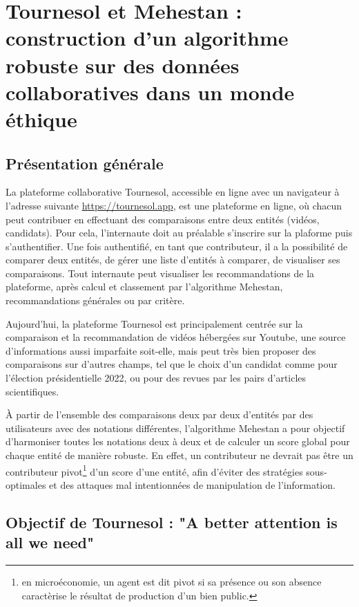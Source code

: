 \section{Tournesol et Mehestan : construction d'un algorithme robuste sur des données collaboratives dans un monde éthique}

\subsection{Présentation générale}

La plateforme collaborative Tournesol, accessible en ligne avec un navigateur à l'adresse suivante \href{https://tournesol.app}{https://tournesol.app}, est une plateforme en ligne, où chacun peut contribuer en effectuant des comparaisons entre deux entités (vidéos, candidats). Pour cela, l'internaute doit au préalable s'inscrire sur la plaforme puis s'authentifier. Une fois authentifié, en tant que contributeur, il a la possibilité de comparer deux entités, de gérer une liste d'entités à comparer, de visualiser ses comparaisons. Tout internaute peut visualiser les recommandations de la plateforme, après calcul et classement par l'algorithme Mehestan, recommandations générales ou par critère.

Aujourd'hui, la plateforme Tournesol est principalement centrée sur la comparaison et la recommandation de vidéos hébergées sur Youtube, une source d'informations aussi imparfaite soit-elle, mais peut très bien proposer des comparaisons sur d'autres champs, tel que le choix d'un candidat comme pour l'élection présidentielle 2022, ou pour des revues par les pairs d'articles scientifiques.

À partir de l'ensemble des comparaisons deux par deux d'entités par des utilisateurs avec des notations différentes, l'algorithme Mehestan a pour objectif d'harmoniser toutes les notations deux à deux et de calculer un score global pour chaque entité de manière robuste. En effet, un contributeur ne devrait pas être un contributeur pivot\footnote{en microéconomie, un agent est dit pivot si sa présence ou son absence caractèrise le résultat de production d'un bien public.} d'un score d'une entité, afin d'éviter des stratégies sous-optimales et des attaques mal intentionnées de manipulation de l'information.

\subsection{Objectif de Tournesol : "A better attention is all we need"}

